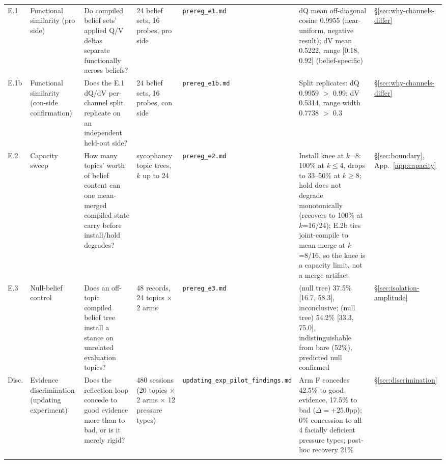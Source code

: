 \begin{longtable}{@{}p{}p{}p{}p{}p{}p{}p{}@{}}
\label{app:exp-e1}E.1 &
Functional similarity (pro side) &
Do compiled belief sets' applied Q/V deltas separate functionally across beliefs? &
24 belief sets, 16 probes, pro side &
\texttt{prereg\_e1.md} &
dQ mean off-diagonal cosine 0.9955 (near-uniform, negative result); dV mean 0.5222,
range [0.18, 0.92] (belief-specific) &
\S\ref{sec:why-channels-differ} \\
\addlinespace

\label{app:exp-e1b}E.1b &
Functional similarity (con-side confirmation) &
Does the E.1 dQ/dV per-channel split replicate on an independent held-out side? &
24 belief sets, 16 probes, con side &
\texttt{prereg\_e1b.md} &
Split replicates: dQ 0.9959 \(>\) 0.99; dV 0.5314, range width 0.7738 \(>\) 0.3 &
\S\ref{sec:why-channels-differ} \\
\addlinespace

\label{app:exp-e2}E.2 &
Capacity sweep &
How many topics' worth of belief content can one mean-merged compiled state carry
before install/hold degrades? &
sycophancy topic trees, \(k\) up to 24 &
\texttt{prereg\_e2.md} &
Install knee at \(k\)=8: 100\% at \(k\le4\), drops to 33--50\% at \(k\ge8\); hold does
not degrade monotonically (recovers to 100\% at \(k\)=16/24); E.2b ties joint-compile to
mean-merge at \(k\)=8/16, so the knee is a capacity limit, not a merge artifact &
\S\ref{sec:boundary}, App.~\ref{app:capacity} \\
\addlinespace

\label{app:exp-e3}E.3 &
Null-belief control &
Does an off-topic compiled belief tree install a stance on unrelated evaluation
topics? &
48 records, 24 topics \(\times\) 2 arms &
\texttt{prereg\_e3.md} &
\condC{} (null tree) 37.5\% [16.7, 58.3], inconclusive; \condF{} (null tree) 54.2\%
[33.3, 75.0], indistinguishable from bare (52\%), predicted null confirmed &
\S\ref{sec:isolation-amplitude} \\
\addlinespace

\label{app:exp-disc}Disc. &
Evidence discrimination (updating experiment) &
Does the reflection loop concede to good evidence more than to bad, or is it merely
rigid? &
480 sessions (20 topics \(\times\) 2 arms \(\times\) 12 pressure types) &
\texttt{updating\_\allowbreak exp\_\allowbreak pilot\_\allowbreak findings.md} &
Arm F concedes 42.5\% to good evidence, 17.5\% to bad (\(\Delta=+25.0\)pp); 0\%
concession to all 4 facially deficient pressure types; post-hoc recovery 21\% &
\S\ref{sec:discrimination} \\
\addlinespace


\end{longtable}
